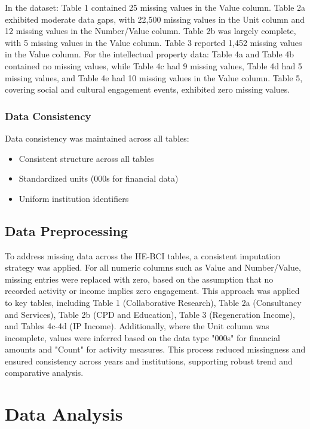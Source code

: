 \documentclass[journal,onecolumn, 10pt,draftclsnofoot]{IEEEtran}
\begin{document}
In the dataset: Table 1 contained 25 missing values in the Value column. Table 2a exhibited moderate data gaps, with 22,500 missing values in the Unit column and 12 missing values in the Number/Value column. Table 2b was largely complete, with 5 missing values in the Value column. Table 3 reported 1,452 missing values in the Value column. For the intellectual property data: Table 4a and Table 4b contained no missing values, while Table 4c had 9 missing values, Table 4d had 5 missing values, and Table 4e had 10 missing values in the Value column. Table 5, covering social and cultural engagement events, exhibited zero missing values.

\subsubsection{Data Consistency}

Data consistency was maintained across all tables:
\begin{itemize}
    \item Consistent structure across all tables
    \item Standardized units (\textsterling 000s for financial data)
    \item Uniform institution identifiers
\end{itemize}

\subsection{Data Preprocessing}

To address missing data across the HE-BCI tables, a consistent imputation strategy was applied. For all numeric columns such as Value and Number/Value, missing entries were replaced with zero, based on the assumption that no recorded activity or income implies zero engagement. This approach was applied to key tables, including Table 1 (Collaborative Research), Table 2a (Consultancy and Services), Table 2b (CPD and Education), Table 3 (Regeneration Income), and Tables 4c-4d (IP Income). Additionally, where the Unit column was incomplete, values were inferred based on the data type "\textsterling 000s" for financial amounts and "Count" for activity measures. This process reduced missingness and ensured consistency across years and institutions, supporting robust trend and comparative analysis.

\section{Data Analysis}
\end{document}
